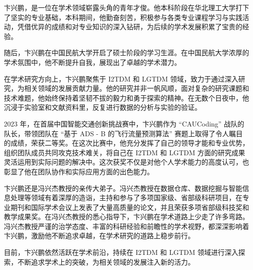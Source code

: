 \documentclass[
	StudentName     = 孙敬垚,
	StudentNameEng	= {{Name of Graduate (such as HAN Bao-cheng)}},
	AdvisorName     = {{冯兴杰 教授}},
	AdvisorNameEng	= {{Name of Supervisor and Title (such as Prof. FENG Chang-gen)}},
        AdvisorNameEngSecond = {{Name of Second Supervisor and Title}},
	StudentID		= XXXXX,
	Major           = ,
	ResearchInterest= ,
	Department		= XXXX学院,
	DepartmentEng	= {{Name of Department (or School)}},
	SubmitYear		= 202X,
	SubmitMonth		= X,
	SubmitDay		= XX,
	DefenseYear		= 202X,
	DefenseMonth	= X,
	DefenseDay		= XX,
	DefenseDateEng	= {{Date of Submit (such as April 2002)}},
	Title           = I2TDM,
	TitleEng        = {{English Title}},
	CLCNumber		= TD235,
	UDCNumber		= 624.152.5
]{cauc_thesis}
\begin{document}
卞兴鹏，是一位在学术领域崭露头角的青年才俊。他本科阶段在华北理工大学打下了坚实的专业基础，本科期间，他勤奋刻苦，积极参与各类专业课程学习与实践活动，凭借优异的成绩和对专业知识的深入钻研，为后续的学术发展积累了宝贵的经验。

随后，卞兴鹏在中国民航大学开启了硕士阶段的学习生涯。在中国民航大学浓厚的学术氛围中，他不断提升自我，展现出了卓越的学术潜力。

在学术研究方向上，卞兴鹏聚焦于 I2TDM 和 LGTDM 领域，致力于通过深入研究，为相关领域的发展贡献力量。他的研究并非一帆风顺，面对复杂的研究课题和技术难题，他始终保持着坚韧不拔的毅力和勇于探索的精神。在无数个日夜中，他沉浸于实验室和文献资料里，反复进行数据的分析与实验的验证。

2023 年，在首届中国智能交通创新挑战赛中，卞兴鹏作为 “CAUCoding” 战队的队长，带领团队在 “基于 ADS - B 的飞行流量预测算法” 赛题上取得了令人瞩目的成绩，荣获二等奖。在这次比赛中，他充分发挥了自己的领导才能和专业优势，组织团队成员共同攻克技术难关，将自己在 I2TDM 和 LGTDM 方面的研究成果灵活运用到实际问题的解决中。这次获奖不仅是对他个人学术能力的高度认可，也彰显了他在团队协作和实际应用方面的出色能力。

卞兴鹏还是冯兴杰教授的亲传大弟子。冯兴杰教授在数据仓库、数据挖掘与智能信息处理等领域有着深厚的造诣，主持和参与了多项国家级、省部级科研项目，在专业期刊和国际学术会议上发表了大量高质量的论文，并且荣获多项省部级科技奖和教学成果奖。在冯兴杰教授的悉心指导下，卞兴鹏在学术道路上少走了许多弯路。冯兴杰教授严谨的治学态度、丰富的科研经验和前瞻性的学术视野，都深深影响着卞兴鹏，激励他不断追求卓越，在学术研究的道路上稳步前行。

目前，卞兴鹏依然活跃在学术前沿，持续在 I2TDM 和 LGTDM 领域进行深入探索，不断追求学术上的突破，为相关领域的发展注入新的活力。
\end{document}
